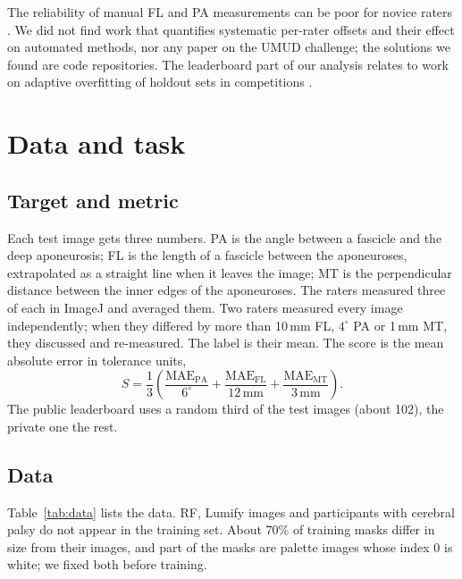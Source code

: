 \documentclass[11pt,a4paper]{article}
\newcommand{\PA}{\mathrm{PA}}
\newcommand{\FL}{\mathrm{FL}}
\newcommand{\MT}{\mathrm{MT}}
\newcommand{\MAE}{\mathrm{MAE}}
\begin{document}
The reliability of manual FL and PA measurements can be poor for novice raters \citep{luera2025novice}. We did not find work that quantifies systematic per-rater offsets and their effect on automated methods, nor any paper on the UMUD challenge; the solutions we found are code repositories. The leaderboard part of our analysis relates to work on adaptive overfitting of holdout sets in competitions \citep{blum2015ladder,roelofs2019meta}.

\section{Data and task}

\subsection{Target and metric}

Each test image gets three numbers. PA is the angle between a fascicle and the deep aponeurosis; FL is the length of a fascicle between the aponeuroses, extrapolated as a straight line when it leaves the image; MT is the perpendicular distance between the inner edges of the aponeuroses. The raters measured three of each in ImageJ and averaged them. Two raters measured every image independently; when they differed by more than 10\,mm FL, $4^\circ$ PA or 1\,mm MT, they discussed and re-measured. The label is their mean. The score is the mean absolute error in tolerance units,
\begin{equation}
S = \frac13\left(\frac{\MAE_\PA}{6^\circ} + \frac{\MAE_\FL}{12\,\mathrm{mm}} + \frac{\MAE_\MT}{3\,\mathrm{mm}}\right).
\end{equation}
The public leaderboard uses a random third of the test images (about 102), the private one the rest.

\subsection{Data}

Table~\ref{tab:data} lists the data. RF, Lumify images and participants with cerebral palsy do not appear in the training set. About 70\% of training masks differ in size from their images, and part of the masks are palette images whose index 0 is white; we fixed both before training.
\end{document}
